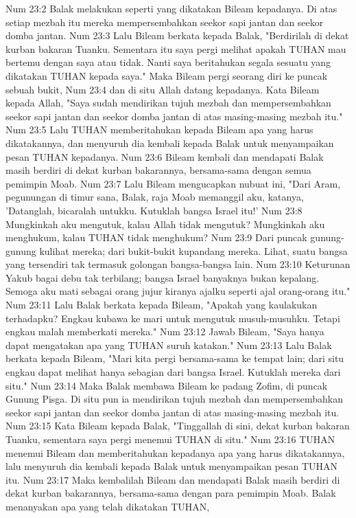 Num 23:2  Balak melakukan seperti yang dikatakan Bileam kepadanya. Di atas setiap mezbah itu mereka mempersembahkan seekor sapi jantan dan seekor domba jantan.
Num 23:3  Lalu Bileam berkata kepada Balak, "Berdirilah di dekat kurban bakaran Tuanku. Sementara itu saya pergi melihat apakah TUHAN mau bertemu dengan saya atau tidak. Nanti saya beritahukan segala sesuatu yang dikatakan TUHAN kepada saya." Maka Bileam pergi seorang diri ke puncak sebuah bukit,
Num 23:4  dan di situ Allah datang kepadanya. Kata Bileam kepada Allah, "Saya sudah mendirikan tujuh mezbah dan mempersembahkan seekor sapi jantan dan seekor domba jantan di atas masing-masing mezbah itu."
Num 23:5  Lalu TUHAN memberitahukan kepada Bileam apa yang harus dikatakannya, dan menyuruh dia kembali kepada Balak untuk menyampaikan pesan TUHAN kepadanya.
Num 23:6  Bileam kembali dan mendapati Balak masih berdiri di dekat kurban bakarannya, bersama-sama dengan semua pemimpin Moab.
Num 23:7  Lalu Bileam mengucapkan nubuat ini, "Dari Aram, pegunungan di timur sana, Balak, raja Moab memanggil aku, katanya, 'Datanglah, bicaralah untukku. Kutuklah bangsa Israel itu!'
Num 23:8  Mungkinkah aku mengutuk, kalau Allah tidak mengutuk? Mungkinkah aku menghukum, kalau TUHAN tidak menghukum?
Num 23:9  Dari puncak gunung-gunung kulihat mereka; dari bukit-bukit kupandang mereka. Lihat, suatu bangsa yang tersendiri tak termasuk golongan bangsa-bangsa lain.
Num 23:10  Keturunan Yakub bagai debu tak terbilang; bangsa Israel banyaknya bukan kepalang. Semoga aku mati sebagai orang jujur kiranya ajalku seperti ajal orang-orang itu."
Num 23:11  Lalu Balak berkata kepada Bileam, "Apakah yang kaulakukan terhadapku? Engkau kubawa ke mari untuk mengutuk musuh-musuhku. Tetapi engkau malah memberkati mereka."
Num 23:12  Jawab Bileam, "Saya hanya dapat mengatakan apa yang TUHAN suruh katakan."
Num 23:13  Lalu Balak berkata kepada Bileam, "Mari kita pergi bersama-sama ke tempat lain; dari situ engkau dapat melihat hanya sebagian dari bangsa Israel. Kutuklah mereka dari situ."
Num 23:14  Maka Balak membawa Bileam ke padang Zofim, di puncak Gunung Pisga. Di situ pun ia mendirikan tujuh mezbah dan mempersembahkan seekor sapi jantan dan seekor domba jantan di atas masing-masing mezbah itu.
Num 23:15  Kata Bileam kepada Balak, "Tinggallah di sini, dekat kurban bakaran Tuanku, sementara saya pergi menemui TUHAN di situ."
Num 23:16  TUHAN menemui Bileam dan memberitahukan kepadanya apa yang harus dikatakannya, lalu menyuruh dia kembali kepada Balak untuk menyampaikan pesan TUHAN itu.
Num 23:17  Maka kembalilah Bileam dan mendapati Balak masih berdiri di dekat kurban bakarannya, bersama-sama dengan para pemimpin Moab. Balak menanyakan apa yang telah dikatakan TUHAN,
